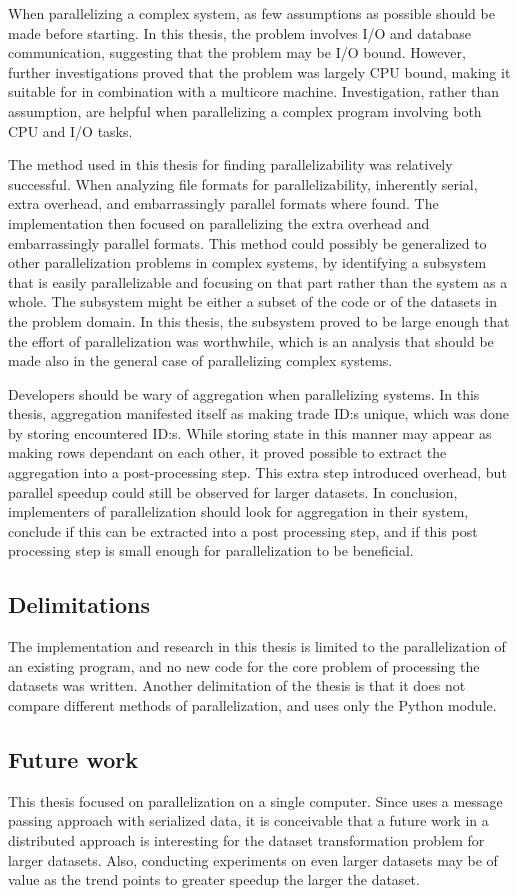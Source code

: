 When parallelizing a complex system, as few assumptions as possible should be made before starting. In this thesis, the problem
involves I/O and database communication, suggesting that the problem may be I/O bound. However, further investigations proved that the problem
was largely CPU bound, making it suitable for  in combination with a multicore machine. Investigation, rather than
assumption, are helpful when parallelizing a complex program involving both CPU and I/O tasks.

The method used in this thesis for finding parallelizability was relatively successful. When analyzing file formats for parallelizability,
inherently serial, extra overhead, and embarrassingly parallel formats where found. The implementation then focused on parallelizing
the extra overhead and embarrassingly parallel formats. This method could possibly be generalized to other parallelization problems
in complex systems, by identifying a subsystem that is easily parallelizable and focusing on that part rather than the system as a whole.
The subsystem might be either a subset of the code or of the datasets in the problem domain. In this thesis, the subsystem proved to be
large enough that the effort of parallelization was worthwhile, which is an analysis that should be made also in the general case of
parallelizing complex systems.

Developers should be wary of aggregation when parallelizing systems. In this thesis, aggregation manifested itself as making trade ID:s unique,
which was done by storing encountered ID:s. While storing state in this manner may appear as making rows dependant on each other, it proved
possible to extract the aggregation into a post-processing step. This extra step introduced overhead, but parallel speedup could still be 
observed for larger datasets. In conclusion, implementers of parallelization should look for aggregation in their system, conclude if this
can be extracted into a post processing step, and if this post processing step is small enough for parallelization to be beneficial.

\subsection{Delimitations}
The implementation and research in this thesis is limited to the parallelization of an existing program, and no new code for the core problem
of processing the datasets was written. Another delimitation of the thesis is that it does not compare different methods of parallelization,
and uses only the Python  module.

\subsection{Future work}
This thesis focused on parallelization on a single computer. Since  uses a message passing approach with serialized data,
it is conceivable that a future work in a distributed approach is interesting for the dataset transformation problem for larger datasets. Also,
conducting experiments on even larger datasets may be of value as the trend points to greater speedup the larger the dataset.

